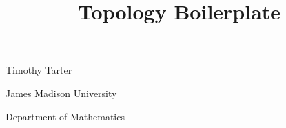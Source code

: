 \documentclass[12 pt]{article}        	%
\title{Topology Boilerplate}
\begin{document}
\maketitle
\begin{center}
    Timothy Tarter

    James Madison University

    Department of Mathematics
\end{center}

\begin{abstract}
\end{abstract}
\end{document}
